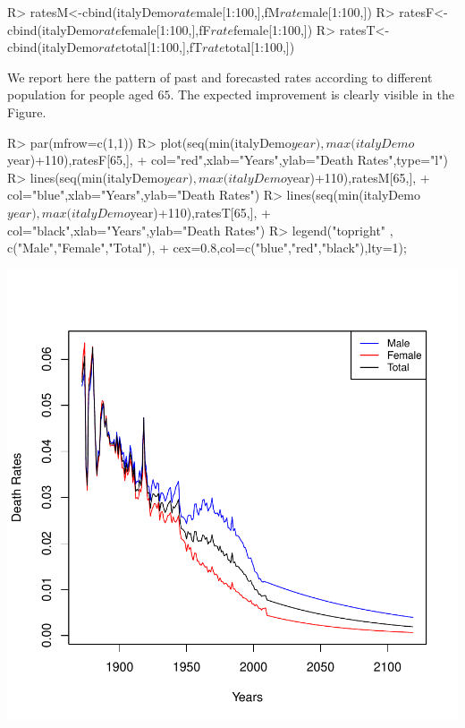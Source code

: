 \documentclass[nojss]{jss}
\begin{document}
\begin{Schunk}
\begin{Sinput}
R> ratesM<-cbind(italyDemo$rate$male[1:100,],fM$rate$male[1:100,])
R> ratesF<-cbind(italyDemo$rate$female[1:100,],fF$rate$female[1:100,])
R> ratesT<-cbind(italyDemo$rate$total[1:100,],fT$rate$total[1:100,])
\end{Sinput}
\end{Schunk}
We report here the pattern of past and forecasted rates according to different population for people aged $65$. The expected improvement is clearly visible in the Figure.

\begin{Schunk}
\begin{Sinput}
R> par(mfrow=c(1,1))
R> plot(seq(min(italyDemo$year),max(italyDemo$year)+110),ratesF[65,],
+       col="red",xlab="Years",ylab="Death Rates",type="l")
R> lines(seq(min(italyDemo$year),max(italyDemo$year)+110),ratesM[65,],
+        col="blue",xlab="Years",ylab="Death Rates")
R> lines(seq(min(italyDemo$year),max(italyDemo$year)+110),ratesT[65,],
+        col="black",xlab="Years",ylab="Death Rates")
R> legend("topright" , c("Male","Female","Total"),
+         cex=0.8,col=c("blue","red","black"),lty=1);
\end{Sinput}
\end{Schunk}
\includegraphics{mortality_projection-ktratesFig}
\end{document}
